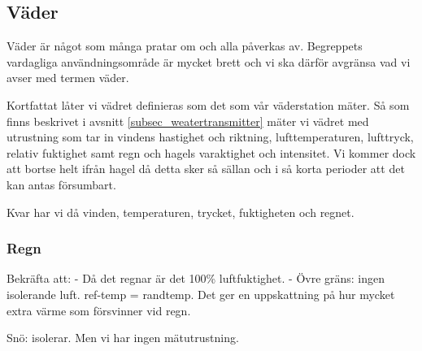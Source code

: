 \subsection{Väder}

Väder är något som många pratar om och alla påverkas av. Begreppets vardagliga användningsområde är mycket brett och vi ska därför avgränsa vad vi avser med termen väder. 

Kortfattat låter vi vädret definieras som det som vår väderstation mäter. Så som finns beskrivet i avsnitt \ref{subsec_weatertransmitter} mäter vi vädret med utrustning som tar in vindens hastighet och riktning, lufttemperaturen, lufttryck, relativ fuktighet samt regn och hagels varaktighet och intensitet. Vi kommer dock att bortse helt ifrån hagel då detta sker så sällan och i så korta perioder att det kan antas försumbart.

Kvar har vi då vinden, temperaturen, trycket, fuktigheten och regnet.


\subsubsection{Regn}
Bekräfta att:
- Då det regnar är det 100\% luftfuktighet.
- Övre gräns: ingen isolerande luft. ref-temp = randtemp.
Det ger en uppskattning på hur mycket extra värme som försvinner vid regn. 


Snö: isolerar. Men vi har ingen mätutrustning.